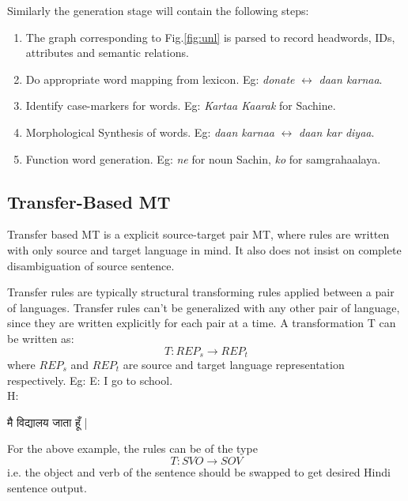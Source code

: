     Similarly the generation stage will contain the following steps:
    \begin{enumerate}
    \item The graph corresponding to Fig.\ref{fig:unl} is parsed to record headwords, IDs, attributes and semantic relations.
    
    \item Do appropriate word mapping from lexicon. Eg: \textit{donate} $\leftrightarrow$ \textit{daan karnaa}.
    
    \item Identify case-markers for words. Eg: \textit{Kartaa Kaarak} for Sachine.
    
    \item Morphological Synthesis of words. Eg: \textit{daan karnaa} $\leftrightarrow$ \textit{daan kar diyaa}.
    
    \item Function word generation. Eg: \textit{ne} for noun Sachin, \textit{ko} for samgrahaalaya.
    \end{enumerate}
    
    \subsection{Transfer-Based MT}
    Transfer based MT is a explicit source-target pair MT, where rules are written with only source and target language in mind. It also does not insist on complete disambiguation of source sentence. 
    
    Transfer rules are typically structural transforming rules applied between a pair of languages. Transfer rules can't be generalized with any other pair of language, since they are written explicitly for each pair at a time. A transformation T can be written as\cite{bhattacharyya}:
    \begin{equation}
    T: REP_s \rightarrow REP_t
    \end{equation}
    where $REP_s$ and $REP_t$ are source and target language representation respectively. \linebreak
    Eg: E: I go to school. \\
    \quad H:
        \begin{hindi}
        मै विद्यालय जाता हूँ |\\
        \end{hindi}
       For the above example, the rules can be of the type
       \begin{equation}
    T: SVO \rightarrow SOV 
    \end{equation}
    i.e. the object and verb of the sentence should be swapped to get desired Hindi sentence output.
        
    
   	
    